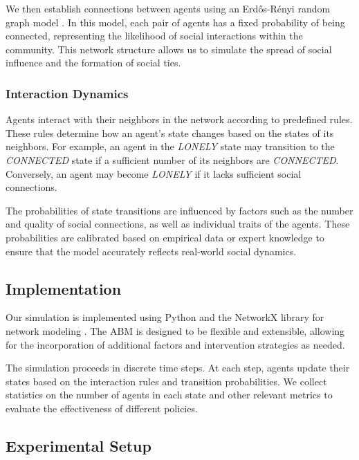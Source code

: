 \documentclass{article} %
\begin{document}
We then establish connections between agents using an Erdős-Rényi random graph model \citep{erdos1959random}. In this model, each pair of agents has a fixed probability of being connected, representing the likelihood of social interactions within the community. This network structure allows us to simulate the spread of social influence and the formation of social ties.

\subsubsection{Interaction Dynamics}
\label{sec:interaction_dynamics}

Agents interact with their neighbors in the network according to predefined rules. These rules determine how an agent's state changes based on the states of its neighbors. For example, an agent in the \textit{LONELY} state may transition to the \textit{CONNECTED} state if a sufficient number of its neighbors are \textit{CONNECTED}. Conversely, an agent may become \textit{LONELY} if it lacks sufficient social connections.

The probabilities of state transitions are influenced by factors such as the number and quality of social connections, as well as individual traits of the agents. These probabilities are calibrated based on empirical data or expert knowledge to ensure that the model accurately reflects real-world social dynamics.

\subsection{Implementation}
\label{sec:implementation}

Our simulation is implemented using Python and the NetworkX library for network modeling \citep{hagberg2008exploring}. The ABM is designed to be flexible and extensible, allowing for the incorporation of additional factors and intervention strategies as needed.

The simulation proceeds in discrete time steps. At each step, agents update their states based on the interaction rules and transition probabilities. We collect statistics on the number of agents in each state and other relevant metrics to evaluate the effectiveness of different policies.

\subsection{Experimental Setup}
\label{sec:experimental_setup}
\end{document}
